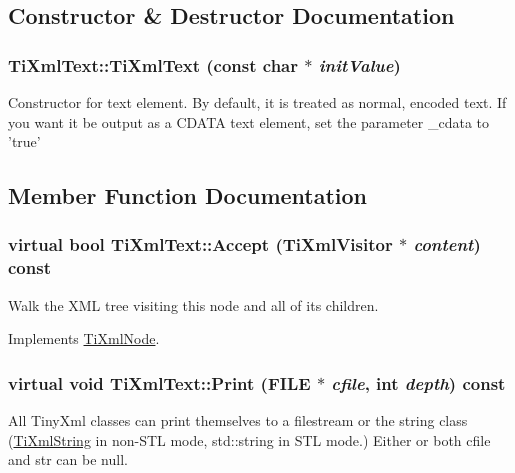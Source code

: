 \subsection{Constructor \& Destructor Documentation}
\hypertarget{class_ti_xml_text_af659e77c6b87d684827f35a8f4895960}{
\subsubsection[{TiXmlText}]{\setlength{\rightskip}{0pt plus 5cm}TiXmlText::TiXmlText (const char $\ast$ {\em initValue})}}
\label{class_ti_xml_text_af659e77c6b87d684827f35a8f4895960}
Constructor for text element. By default, it is treated as normal, encoded text. If you want it be output as a CDATA text element, set the parameter \_\-cdata to 'true' 

\subsection{Member Function Documentation}
\hypertarget{class_ti_xml_text_a8483d4415ce9de6c4fa8f63d067d5de6}{
\subsubsection[{Accept}]{\setlength{\rightskip}{0pt plus 5cm}virtual bool TiXmlText::Accept ({\bf TiXmlVisitor} $\ast$ {\em content}) const}}
\label{class_ti_xml_text_a8483d4415ce9de6c4fa8f63d067d5de6}
Walk the XML tree visiting this node and all of its children. 

Implements \hyperlink{class_ti_xml_node_acc0f88b7462c6cb73809d410a4f5bb86}{TiXmlNode}.\hypertarget{class_ti_xml_text_a0cafbf6f236c7f02d12b2bffc2b7976b}{
\subsubsection[{Print}]{\setlength{\rightskip}{0pt plus 5cm}virtual void TiXmlText::Print (FILE $\ast$ {\em cfile}, \/  int {\em depth}) const}}
\label{class_ti_xml_text_a0cafbf6f236c7f02d12b2bffc2b7976b}
All TinyXml classes can print themselves to a filestream or the string class (\hyperlink{class_ti_xml_string}{TiXmlString} in non-\/STL mode, std::string in STL mode.) Either or both cfile and str can be null.


